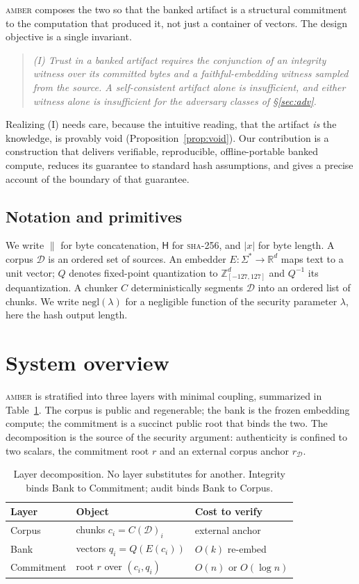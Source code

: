 \documentclass[10pt,twocolumn]{article}
\theoremstyle{remark}
\begin{document}
\textsc{amber} composes the two so that the banked artifact is a structural
commitment to the computation that produced it, not just a container of vectors.
The design objective is a single invariant.
\begin{quote}
\itshape (I) Trust in a banked artifact requires the conjunction of an integrity
witness over its committed bytes and a faithful-embedding witness sampled from
the source. A self-consistent artifact alone is insufficient, and either witness
alone is insufficient for the adversary classes of \S\ref{sec:adv}.
\end{quote}
Realizing (I) needs care, because the intuitive reading, that the artifact
\emph{is} the knowledge, is provably void (Proposition~\ref{prop:void}). Our
contribution is a construction that delivers verifiable, reproducible,
offline-portable banked compute, reduces its guarantee to standard hash
assumptions, and gives a precise account of the boundary of that guarantee.

\subsection{Notation and primitives}
We write $\|$ for byte concatenation, $\mathsf{H}$ for \textsc{sha-256}, and
$|x|$ for byte length. A corpus $\mathcal{D}$ is an ordered set of sources. An
embedder $E:\Sigma^\ast\to\mathbb{R}^d$ maps text to a unit vector; $Q$ denotes
fixed-point quantization to $\mathbb{Z}_{[-127,127]}^d$ and $Q^{-1}$ its
dequantization. A chunker $C$ deterministically segments $\mathcal{D}$ into an
ordered list of chunks. We write $\mathrm{negl}(\lambda)$ for a negligible
function of the security parameter $\lambda$, here the hash output length.

\section{System overview}
\textsc{amber} is stratified into three layers with minimal coupling, summarized
in Table~\ref{tab:layers}. The corpus is public and regenerable; the bank is the
frozen embedding compute; the commitment is a succinct public root that binds the
two. The decomposition is the source of the security argument: authenticity is
confined to two scalars, the commitment root $r$ and an external corpus anchor
$r_{\mathcal D}$.

\begin{table}[t]
\centering
\small
\begin{tabular}{lll}
\toprule
Layer & Object & Cost to verify \\
\midrule
Corpus & chunks $c_i = C(\mathcal{D})_i$ & external anchor \\
Bank & vectors $q_i = Q(E(c_i))$ & $O(k)$ re-embed \\
Commitment & root $r$ over $(c_i,q_i)$ & $O(n)$ or $O(\log n)$ \\
\bottomrule
\end{tabular}
\caption{Layer decomposition. No layer substitutes for another. Integrity binds
Bank to Commitment; audit binds Bank to Corpus.}
\label{tab:layers}
\end{table}
\end{document}
